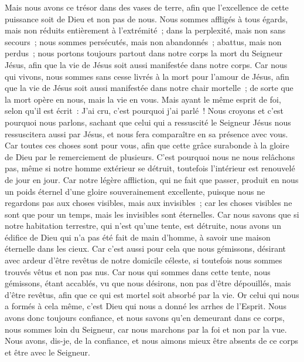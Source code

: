 \begin{multicols}{2}
Mais nous avons ce trésor dans des vases de terre, afin que l'excellence de cette puissance soit de Dieu et non pas de nous.
Nous sommes affligés à tous égards, mais non réduits entièrement à l'extrémité~; dans la perplexité, mais non sans secours~;
nous sommes persécutés, mais non abandonnés~; abattus, mais non perdus~;
nous portons toujours partout dans notre corps la mort du Seigneur Jésus, afin que la vie de Jésus soit aussi manifestée dans notre corps.
Car nous qui vivons, nous sommes sans cesse livrés à la mort pour l'amour de Jésus, afin que la vie de Jésus soit aussi manifestée dans notre chair mortelle~;
de sorte que la mort opère en nous, mais la vie en vous.
Mais ayant le même esprit de foi, selon qu'il est écrit~: J'ai cru, c'est pourquoi j'ai parlé~! Nous croyons et c'est pourquoi nous parlons,
sachant que celui qui a ressuscité le Seigneur Jésus nous ressuscitera aussi par Jésus, et nous fera comparaître en sa présence avec vous.
Car toutes ces choses sont pour vous, afin que cette grâce surabonde à la gloire de Dieu par le remerciement de plusieurs.
C'est pourquoi nous ne nous relâchons pas, même si notre homme extérieur se détruit, toutefois l'intérieur est renouvelé de jour en jour.
Car notre légère affliction, qui ne fait que passer, produit en nous un poids éternel d'une gloire souverainement excellente,
puisque nous ne regardons pas aux choses visibles, mais aux invisibles~; car les choses visibles ne sont que pour un temps, mais les invisibles sont éternelles.
\VerseOne{}Car nous savons que si notre habitation terrestre, qui n'est qu'une tente, est détruite, nous avons un édifice de Dieu qui n'a pas été fait de main d'homme, à savoir une maison éternelle dans les cieux.
Car c'est aussi pour cela que nous gémissons, désirant avec ardeur d'être revêtus de notre domicile céleste,
si toutefois nous sommes trouvés vêtus et non pas nus.
Car nous qui sommes dans cette tente, nous gémissons, étant accablés, vu que nous désirons, non pas d'être dépouillés, mais d'être revêtus, afin que ce qui est mortel soit absorbé par la vie.
Or celui qui nous a formés à cela même, c'est Dieu qui nous a donné les arrhes de l'Esprit.
Nous avons donc toujours confiance, et nous savons qu'en demeurant dans ce corps, nous sommes loin du Seigneur,
car nous marchons par la foi et non par la vue.
Nous avons, dis-je, de la confiance, et nous aimons mieux être absents de ce corps et être avec le Seigneur.

\end{multicols}
